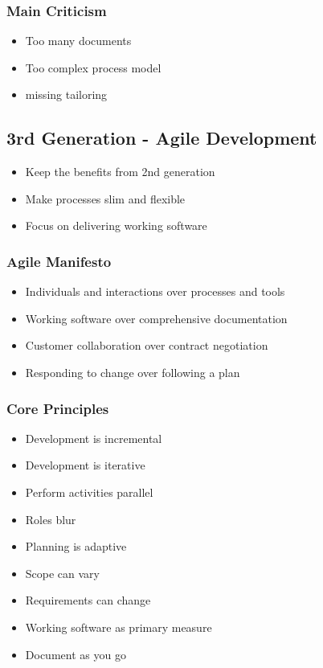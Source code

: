\subsubsection{Main Criticism}
\begin{itemize}
    \item Too many documents
    \item Too complex process model
    \item missing tailoring
\end{itemize}

\subsection{3rd Generation - Agile Development}
\begin{itemize}
    \item Keep the benefits from 2nd generation
    \item Make processes slim and flexible
    \item Focus on delivering working software
\end{itemize}

\subsubsection{Agile Manifesto}
\begin{itemize}
    \item Individuals and interactions over processes and tools
    \item Working software over comprehensive documentation
    \item Customer collaboration over contract negotiation
    \item Responding to change over following a plan
\end{itemize}

\subsubsection{Core Principles}
\begin{itemize}
    \item Development is incremental
    \item Development is iterative
    \item Perform activities parallel
    \item Roles blur
    \item Planning is adaptive
    \item Scope can vary
    \item Requirements can change
    \item Working software as primary measure
    \item Document as you go
\end{itemize}

